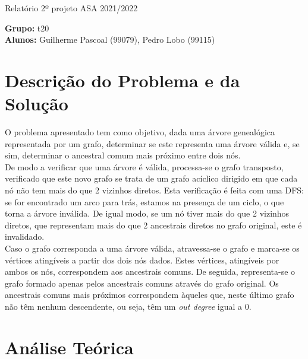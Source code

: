 \documentclass[12pt, letterpaper]{article}
\begin{document}
\begin{center}
	{\LARGE{Relatório 2º projeto ASA 2021/2022}}\\[\baselineskip]
\end{center}

\begin{flushleft}
	\textbf{Grupo:} t20\\
	\textbf{Alunos:} Guilherme Pascoal (99079), Pedro Lobo (99115)
\end{flushleft}


\section{Descrição do Problema e da Solução}

O problema apresentado tem como objetivo, dada uma árvore genealógica
representada por um grafo, determinar se este representa uma árvore válida e,
se sim, determinar o ancestral comum mais próximo entre dois nós.\\

De modo a verificar que uma árvore é válida, processa-se o grafo transposto,
verificado que este novo grafo se trata de um grafo acíclico dirigido em que cada
nó não tem mais do que 2 vizinhos diretos.
Esta verificação é feita com uma DFS: se for encontrado um arco para trás,
estamos na presença de um ciclo, o que torna a árvore inválida. De igual modo,
se um nó tiver mais do que 2 vizinhos diretos, que representam mais do que 2
ancestrais diretos no grafo original, este é invalidado.\\

Caso o grafo corresponda a uma árvore válida, atravessa-se o grafo e marca-se os
vértices atingíveis a partir dos dois nós dados. Estes vértices, atingíveis por
ambos os nós, correspondem aos ancestrais comuns. De seguida, representa-se o
grafo formado apenas pelos ancestrais comuns através do grafo original. Os
ancestrais comuns mais próximos correspondem àqueles que, neste último grafo
não têm nenhum descendente, ou seja, têm um \emph{out degree} igual a 0.\\


\section{Análise Teórica}
\end{document}
